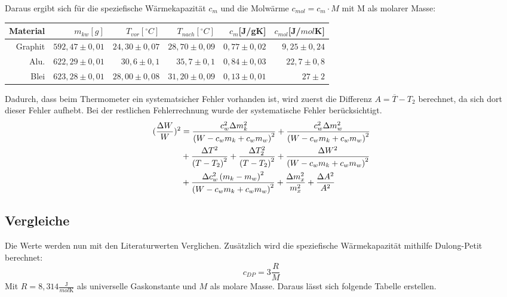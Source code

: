 Daraus ergibt sich für die speziefische Wärmekapazität $c_m$ und die Molwärme $c_{mol} = c_m\cdot M$ mit M als molarer Masse:

\begin{table}[h!]
    \centering
    \begin{tabular}{r r r r r r}
        \toprule
        Material & $m_{kw}[g]$& $T_{vor} [^\circ C] $&  $T_{nach}[^\circ C] $& $c_m$[J/gK] & $c_{mol}$[J/$mol$K] \\
        \midrule
        Graphit & $592,47 \pm 0,01 $ & $24,30 \pm 0,07$ & $28,70 \pm 0,09$ & $0,77 \pm 0,02 $ & $9,25\pm0,24$\\
        Alu. &$622,29 \pm 0,01$ &$30,6 \pm 0,1 $&$ 35,7 \pm0,1$& $0,84 \pm 0,03$ & $22,7 \pm 0,8$\\
        Blei & $ 623,28 \pm 0,01$ & $28,00 \pm 0,08$& $31,20 \pm 0,09$ & $0,13 \pm 0,01$ & $27 \pm 2$\\
        
    \end{tabular}
\end{table}
Dadurch, dass beim Thermometer ein systematsicher Fehler vorhanden ist, wird zuerst die Differenz $A = \overline{T} - T_2$ berechnet, da sich dort dieser Fehler aufhebt.
Bei der restlichen Fehlerrechnung wurde der systematische Fehler berücksichtigt.
\begin{align}
    (\frac{\Delta W}{W})^2 &=\frac{c_{w}^{2} \Delta m_{k}^{2}}{\left(W - c_{w} m_{k} + c_{w} m_{w}\right)^{2}} + \frac{c_{w}^{2} \Delta m_{w}^{2}}{\left(W - c_{w} m_{k} + c_{w} m_{w}\right)^{2}} \notag \\
    & + \frac{\Delta T^{2}}{\left(T - T_{2}\right)^{2}} + \frac{\Delta T_{2}^{2}}{\left(T - T_{2}\right)^{2}} + \frac{\Delta W^{2}}{\left(W - c_{w} m_{k} + c_{w} m_{w}\right)^{2}}\notag \\
    & + \frac{\Delta c_{w}^{2} \left(m_{k} - m_{w}\right)^{2}}{\left(W - c_{w} m_{k} + c_{w} m_{w}\right)^{2}} + \frac{\Delta m_{x}^{2}}{m_{x}^{2}} + \frac{\Delta A^{2}}{A^{2}}\notag\\
\end{align}

\subsection{Vergleiche}
Die Werte werden nun mit den Literaturwerten Verglichen. Zusätzlich wird die speziefische Wärmekapazität
mithilfe Dulong-Petit berechnet:
\begin{equation}
    c_{DP} = 3 \frac{R}{M}
\end{equation}
Mit $R = 8,314 \frac{\text{J}}{mol \text{K}}$ als universelle Gaskonstante und $M$ als molare Masse. Daraus
lässt sich folgende Tabelle erstellen.


